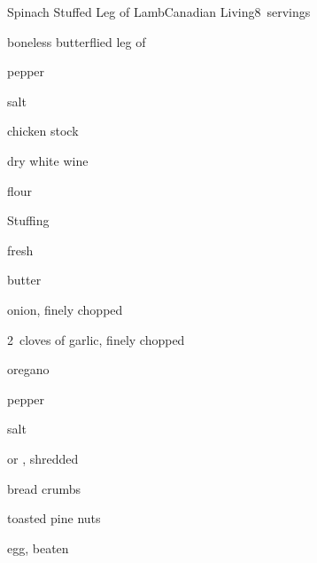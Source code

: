 \begin{recipe}{Spinach Stuffed Leg of Lamb}{Canadian Living}{8~servings}

\begin{ingredients}
\item {} boneless butterflied leg of 
\item \tp{\half} pepper
\item \tp{\quarter} salt
\item {} chicken stock
\item \C{\quarter} dry white wine
\item {} flour
\end{ingredients}

Stuffing
\begin{ingredients}
\item {} fresh 
\item {} butter
\item onion, finely chopped
\item 2~cloves of garlic, finely chopped
\item {} oregano
\item \tp{\half} pepper
\item \tp{\quarter} salt
\item \C{\half}  or , shredded
\item \C{\half} bread crumbs
\item \C{\third} toasted pine nuts
\item egg, beaten
\end{ingredients}


\end{recipe}
